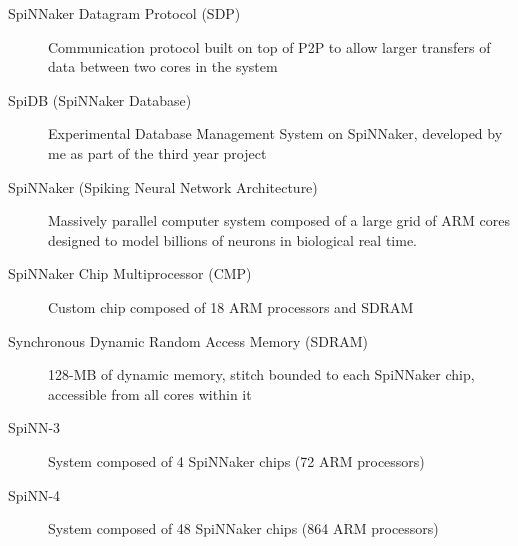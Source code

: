 \begin{description}
  \item[SpiNNaker Datagram Protocol (SDP)] Communication protocol built on top of P2P to allow larger transfers of data between two cores in the system  
    
  \item[SpiDB (SpiNNaker Database)] Experimental Database Management System on SpiNNaker, developed by me as part of the third year project
  
  \item[SpiNNaker (Spiking Neural Network Architecture)] Massively parallel computer system composed of a large grid of ARM cores designed to model billions of neurons in biological real time.\cite{painkras}
  
  \item[SpiNNaker Chip Multiprocessor (CMP)] Custom chip composed of 18 ARM processors and SDRAM  
  
  \item[Synchronous Dynamic Random Access Memory (SDRAM)] 128-MB of dynamic memory, stitch bounded to each SpiNNaker chip, accessible from all cores within it
  
  \item[SpiNN-3] System composed of 4 SpiNNaker chips (72 ARM processors)
  \item[SpiNN-4] System composed of 48 SpiNNaker chips (864 ARM processors)  

\end{description}